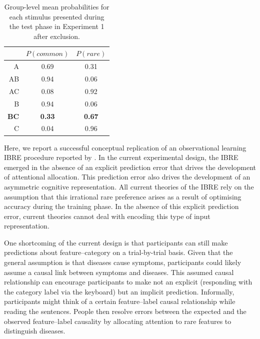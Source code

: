 \documentclass[10pt,letterpaper]{article}
\begin{document}
\begin{table}[ht]
  \begin{center}
    \caption{Group-level mean probabilities for each stimulus presented during the test phase in Experiment 1 after exclusion. \\}
    \label{tab:results-exp1}
    \vskip 0.12in
    \begin{tabular}{rcc}
      \hline
      & $P(common)$ & $P(rare)$ \\
      \hline
      A & 0.69 & 0.31 \\
      AB & 0.94 & 0.06 \\
      AC & 0.08 & 0.92 \\
      B & 0.94 & 0.06 \\
      \textbf{BC} & \textbf{0.33} & \textbf{0.67} \\
      C & 0.04 & 0.96 \\
    \end{tabular}
  \end{center}
\end{table}

Here, we report a successful conceptual replication of an observational learning IBRE procedure reported by \cite{johansen2007paradoxical}.
In the current experimental design, the IBRE emerged in the absence of an explicit prediction error that drives the development of attentional allocation.
This prediction error also drives the development of an asymmetric cognitive representation.
All current theories of the IBRE rely on the assumption that this irrational rare preference arises as a result of optimising accuracy during the training phase.
In the absence of this explicit prediction error, current theories cannot deal with encoding this type of input representation.

One shortcoming of the current design is that participants can still make predictions about feature--category on a trial-by-trial basis.
Given that the general assumption is that diseases cause symptoms, participants could likely assume a causal link between symptoms and diseases.
This assumed causal relationship can encourage participants to make not an explicit (responding with the category label via the keyboard) but an implicit prediction.
Informally, participants might think of a certain feature--label causal relationship while reading the sentences.
People then resolve errors between the expected and the observed feature--label causality by allocating attention to rare features to distinguish diseases.
\end{document}
